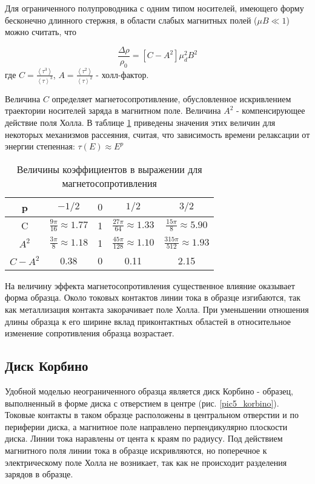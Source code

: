 Для ограниченного полупроводника с одним типом носителей, имеющего форму бесконечно длинного стержня, в области слабых магнитных полей ($\mu B \ll 1$) можно считать, что

\begin{equation}
\frac{\Delta \rho}{\rho_{0}} = [C - A^2] \mu^{2}_{d} B^2
\end{equation}
где $C = \frac{\left< \tau^3 \right>}{\left< \tau \right>^3}$, $A = \frac{\left< \tau^2 \right>}{\left< \tau \right>^2}$ - холл-фактор.

Величина $C$ определяет магнетосопротивление, обусловленное искривлением траектории носителей заряда в магнитном поле. Величина $A^2$ - компенсирующее действие поля Холла. В таблице \ref{table5_koef} приведены значения этих величин для некоторых механизмов рассеяния, считая, что зависимость времени релаксации от энергии степенная: $\tau(E) \approx E^p$

\begin{table}[h!]
\caption{Величины коэффициентов в выражении для магнетосопротивления}
\begin{center}
\begin{tabular}{c|c|c|c|c}
p & $-1/2$ & $0$ & $1/2$ & $3/2$ \\
\hline
C & $\frac{9 \pi}{16} \approx 1.77$ & 1 & $\frac{27 \pi}{64} \approx 1.33$ & $\frac{15 \pi}{8} \approx 5.90$ \\
$A^2$ & $\frac{3 \pi}{8} \approx 1.18$ & 1 & $\frac{45 \pi}{128} \approx 1.10$ & $\frac{315 \pi}{512} \approx 1.93$ \\
$C-A^2$ & 0.38 & 0 & 0.11 & 2.15 \\
\hline
\end{tabular}
\end{center}
\label{table5_koef}
\end{table}

На величину эффекта магнетосопротивления существенное влияние оказывает форма образца. Около токовых контактов линии тока в образце изгибаются, так как металлизация контакта закорачивает поле Холла. При уменьшении отношения длины образца к его ширине вклад приконтактных областей в относительное изменение сопротивления образца возрастает.

\subsection{Диск Корбино}
Удобной моделью неограниченного образца является диск Корбино - образец, выполненный в форме диска с отверстием в центре (рис. \ref{pic5_korbino}). Токовые контакты в таком образце расположены в центральном отверстии и по периферии диска, а магнитное поле направлено перпендикулярно плоскости диска. Линии тока наравлены от цента к краям по радиусу. Под действием магнитного поля линии тока в образце искривляются, но поперечное к электрическому поле Холла не возникает, так как не происходит разделения зарядов в образце.

